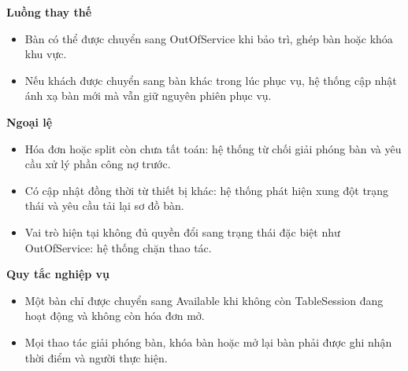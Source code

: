 \documentclass[11pt,a4paper]{article}
\begin{document}
\begin{usecasebox}[title={UC-RES-04 --- Cập nhật trạng thái bàn và giải phóng bàn}]
    \textbf{Luồng thay thế}
    \begin{itemize}[leftmargin=1.8em]
  \item Bàn có thể được chuyển sang \textsf{OutOfService} khi bảo trì, ghép bàn hoặc khóa khu vực.
  \item Nếu khách được chuyển sang bàn khác trong lúc phục vụ, hệ thống cập nhật ánh xạ bàn mới mà vẫn giữ nguyên phiên phục vụ.
\end{itemize}

    \textbf{Ngoại lệ}
    \begin{itemize}[leftmargin=1.8em]
  \item Hóa đơn hoặc split còn chưa tất toán: hệ thống từ chối giải phóng bàn và yêu cầu xử lý phần công nợ trước.
  \item Có cập nhật đồng thời từ thiết bị khác: hệ thống phát hiện xung đột trạng thái và yêu cầu tải lại sơ đồ bàn.
  \item Vai trò hiện tại không đủ quyền đổi sang trạng thái đặc biệt như \textsf{OutOfService}: hệ thống chặn thao tác.
\end{itemize}

    \textbf{Quy tắc nghiệp vụ}
    \begin{itemize}[leftmargin=1.8em]
  \item Một bàn chỉ được chuyển sang \textsf{Available} khi không còn \textsf{TableSession} đang hoạt động và không còn hóa đơn mở.
  \item Mọi thao tác giải phóng bàn, khóa bàn hoặc mở lại bàn phải được ghi nhận thời điểm và người thực hiện.
\end{itemize}
    \end{usecasebox}
\end{document}
